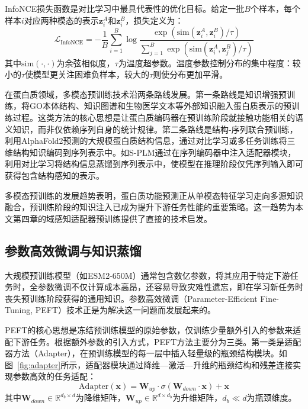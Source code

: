 InfoNCE\cite{oord2018representation}损失函数是对比学习中最具代表性的优化目标。给定一批$B$个样本，每个样本$i$对应两种模态的表示$\mathbf{z}_i^A$和$\mathbf{z}_i^B$，损失定义为：
\begin{equation}
\mathcal{L}_{\text{InfoNCE}} = -\frac{1}{B}\sum_{i=1}^{B}\log\frac{\exp(\text{sim}(\mathbf{z}_i^A, \mathbf{z}_i^B)/\tau)}{\sum_{j=1}^{B}\exp(\text{sim}(\mathbf{z}_i^A, \mathbf{z}_j^B)/\tau)}
\end{equation}
其中$\text{sim}(\cdot, \cdot)$为余弦相似度，$\tau$为温度超参数。温度参数控制分布的集中程度：较小的$\tau$使模型更关注困难负样本，较大的$\tau$则使分布更加平滑。

在蛋白质领域，多模态预训练技术沿两条路线发展。第一条路线是知识增强预训练，将GO本体结构、知识图谱和生物医学文本等外部知识融入蛋白质表示的预训练过程。这类方法的核心思想是让蛋白质编码器在预训练阶段就接触功能相关的语义知识，而非仅依赖序列自身的统计规律。第二条路线是结构-序列联合预训练，利用AlphaFold2预测的大规模蛋白质结构信息，通过对比学习或多任务训练将三维结构知识编码到序列表示中。如S-PLM\cite{wang2025splm}通过在序列编码器中注入适配器模块，利用对比学习将结构信息蒸馏到序列表示中，使模型在推理阶段仅凭序列输入即可获得包含结构感知的表示。

多模态预训练的发展趋势表明，蛋白质功能预测正从单模态特征学习走向多源知识融合，预训练阶段的知识注入已成为提升下游任务性能的重要策略。这一趋势为本文第四章的域感知适配器预训练提供了直接的技术启发。

\subsection{参数高效微调与知识蒸馏}

大规模预训练模型（如ESM2-650M）通常包含数亿参数，将其应用于特定下游任务时，全参数微调不仅计算成本高昂，还容易导致灾难性遗忘，即在学习新任务时丧失预训练阶段获得的通用知识。参数高效微调（Parameter-Efficient Fine-Tuning, PEFT）技术正是为解决这一问题而发展起来的。

PEFT的核心思想是冻结预训练模型的原始参数，仅训练少量额外引入的参数来适配下游任务。根据额外参数的引入方式，PEFT方法主要分为三类。第一类是适配器方法（Adapter）\cite{houlsby2019adapter}，在预训练模型的每一层中插入轻量级的瓶颈结构模块。如图~\ref{fig:adapter}所示，适配器模块通过降维—激活—升维的瓶颈结构和残差连接实现参数高效的任务适配：
\begin{equation}
\text{Adapter}(\mathbf{x}) = \mathbf{W}_{up} \cdot \sigma(\mathbf{W}_{down} \cdot \mathbf{x}) + \mathbf{x}
\end{equation}
其中$\mathbf{W}_{down} \in \mathbb{R}^{d_b \times d}$为降维矩阵，$\mathbf{W}_{up} \in \mathbb{R}^{d \times d_b}$为升维矩阵，$d_b \ll d$为瓶颈维度。

